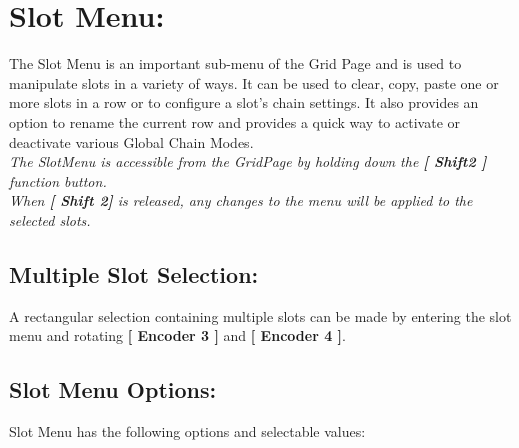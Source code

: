 \chapter{Slot Menu:}

The Slot Menu is an important sub-menu of the Grid Page and is used to manipulate slots in a variety of ways. It can be used to clear, copy, paste one or more slots in a row or to configure a slot's chain settings. It also provides an option to rename the current row and provides a quick way to activate or deactivate various Global Chain Modes.
\\
\textit{The SlotMenu is accessible from the GridPage by holding down the  \textbf{[ Shift2 ]} function button.\\
When \textbf{[ Shift 2]} is released, any changes to the menu will be applied to the selected slots. }
\\
\section{Multiple Slot Selection:}
A rectangular selection containing multiple slots can be made by entering the slot menu and rotating \textbf{[ Encoder 3 ]} and \textbf{[ Encoder 4 ]}.


\section{Slot Menu Options:}
Slot Menu has the following options and selectable values:

